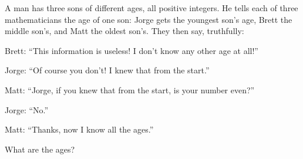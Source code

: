 A man has three sons of different ages, all positive integers. He tells each of three mathematicians the age of one son: Jorge gets the youngest son's age, Brett the middle son's, and Matt the oldest son's. They then say, truthfully:

Brett: ``This information is useless! I don't know any other age at all!''

Jorge: ``Of course you don't! I knew that from the start.''

Matt: ``Jorge, if you knew that from the start, is your number even?''

Jorge: ``No.''

Matt: ``Thanks, now I know all the ages.''

What are the ages?
